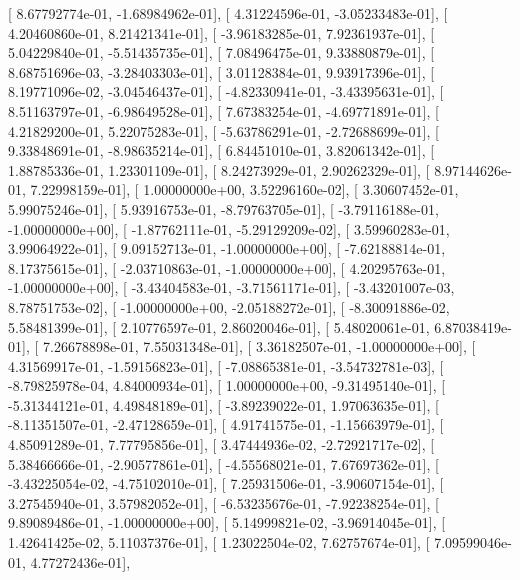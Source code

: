 \documentclass{article}
\begin{document}
       [  8.67792774e-01,  -1.68984962e-01],
       [  4.31224596e-01,  -3.05233483e-01],
       [  4.20460860e-01,   8.21421341e-01],
       [ -3.96183285e-01,   7.92361937e-01],
       [  5.04229840e-01,  -5.51435735e-01],
       [  7.08496475e-01,   9.33880879e-01],
       [  8.68751696e-03,  -3.28403303e-01],
       [  3.01128384e-01,   9.93917396e-01],
       [  8.19771096e-02,  -3.04546437e-01],
       [ -4.82330941e-01,  -3.43395631e-01],
       [  8.51163797e-01,  -6.98649528e-01],
       [  7.67383254e-01,  -4.69771891e-01],
       [  4.21829200e-01,   5.22075283e-01],
       [ -5.63786291e-01,  -2.72688699e-01],
       [  9.33848691e-01,  -8.98635214e-01],
       [  6.84451010e-01,   3.82061342e-01],
       [  1.88785336e-01,   1.23301109e-01],
       [  8.24273929e-01,   2.90262329e-01],
       [  8.97144626e-01,   7.22998159e-01],
       [  1.00000000e+00,   3.52296160e-02],
       [  3.30607452e-01,   5.99075246e-01],
       [  5.93916753e-01,  -8.79763705e-01],
       [ -3.79116188e-01,  -1.00000000e+00],
       [ -1.87762111e-01,  -5.29129209e-02],
       [  3.59960283e-01,   3.99064922e-01],
       [  9.09152713e-01,  -1.00000000e+00],
       [ -7.62188814e-01,   8.17375615e-01],
       [ -2.03710863e-01,  -1.00000000e+00],
       [  4.20295763e-01,  -1.00000000e+00],
       [ -3.43404583e-01,  -3.71561171e-01],
       [ -3.43201007e-03,   8.78751753e-02],
       [ -1.00000000e+00,  -2.05188272e-01],
       [ -8.30091886e-02,   5.58481399e-01],
       [  2.10776597e-01,   2.86020046e-01],
       [  5.48020061e-01,   6.87038419e-01],
       [  7.26678898e-01,   7.55031348e-01],
       [  3.36182507e-01,  -1.00000000e+00],
       [  4.31569917e-01,  -1.59156823e-01],
       [ -7.08865381e-01,  -3.54732781e-03],
       [ -8.79825978e-04,   4.84000934e-01],
       [  1.00000000e+00,  -9.31495140e-01],
       [ -5.31344121e-01,   4.49848189e-01],
       [ -3.89239022e-01,   1.97063635e-01],
       [ -8.11351507e-01,  -2.47128659e-01],
       [  4.91741575e-01,  -1.15663979e-01],
       [  4.85091289e-01,   7.77795856e-01],
       [  3.47444936e-02,  -2.72921717e-02],
       [  5.38466666e-01,  -2.90577861e-01],
       [ -4.55568021e-01,   7.67697362e-01],
       [ -3.43225054e-02,  -4.75102010e-01],
       [  7.25931506e-01,  -3.90607154e-01],
       [  3.27545940e-01,   3.57982052e-01],
       [ -6.53235676e-01,  -7.92238254e-01],
       [  9.89089486e-01,  -1.00000000e+00],
       [  5.14999821e-02,  -3.96914045e-01],
       [  1.42641425e-02,   5.11037376e-01],
       [  1.23022504e-02,   7.62757674e-01],
       [  7.09599046e-01,   4.77272436e-01],
\end{document}
